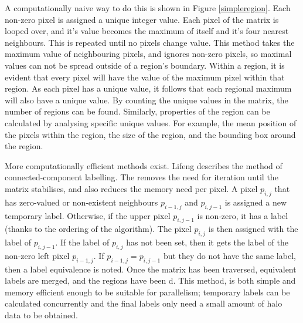 \documentclass[../main.tex]{subfiles}
\begin{document}
    A computationally naive way to do this is shown in Figure \ref{simpleregion}.
    Each non-zero pixel is assigned a unique integer value.
    Each pixel of the matrix is looped over, and it's value becomes the maximum of itself and it's four nearest neighbours.
    This is repeated until no pixels change value.
    This method takes the maximum value of neighbouring pixels, and ignores non-zero pixels, so maximal values can not be spread outside of a region's boundary.
    Within a region, it is evident that every pixel will have the value of the maximum pixel within that region.
    As each pixel has a unique value, it follows that each regional maximum will also have a unique value.
    By counting the unique values in the matrix, the number of regions can be found.
    Similarly, properties of the region can be calculated by analysing specific unique values.
    For example, the mean position of the pixels within the region, the size of the region, and the bounding box around the region.

    More computationally efficient methods exist.
    Lifeng \cite{efficientregion} describes the method of connected-component labelling.
    The removes the need for iteration until the matrix stabilises, and also reduces the memory need per pixel.
    A pixel $p_{i,j}$ that has zero-valued or non-existent neighbours $p_{i-1,j}$ and $p_{i,j-1}$ is assigned a new temporary label.
    Otherwise, if the upper pixel $p_{i,j-1}$ is non-zero, it has a label (thanks to the ordering of the algorithm).
    The pixel $p_{i,j}$ is then assigned with the label of $p_{i,j-1}$.
    If the label of $p_{i,j}$ has not been set, then it gets the label of the non-zero left pixel $p_{i-1,j}$.
    If $p_{i-1,j} = p_{i,j-1}$ but they do not have the same label, then a label equivalence is noted.
    Once the matrix has been traversed, equivalent labels are merged, and the regions have been d.
    This method, is both simple and memory efficient enough to be suitable for parallelism; temporary labels can be calculated concurrently and the final labels only need a small amount of halo data to be obtained.
\end{document}
